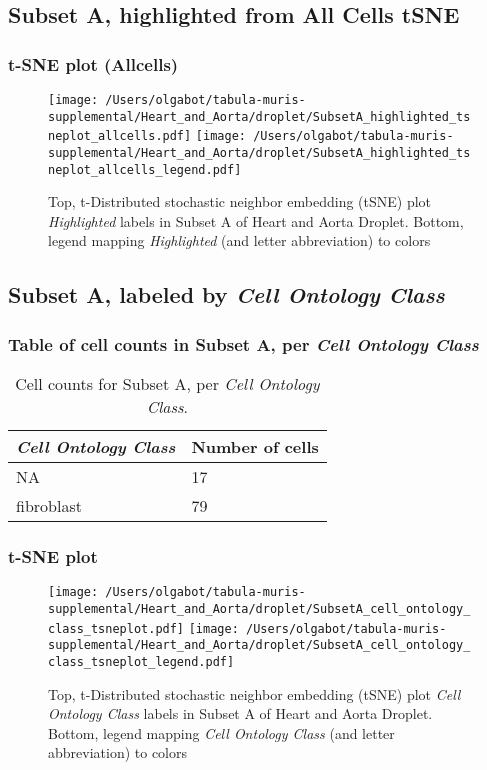 \clearpage
\subsection{Subset A, highlighted from All Cells tSNE}
\subsubsection{t-SNE plot (Allcells)}
\begin{figure}[h]
\centering
\texttt{[image: /Users/olgabot/tabula-muris-supplemental/Heart\_and\_Aorta/droplet/SubsetA\_highlighted\_tsneplot\_allcells.pdf]}
\texttt{[image: /Users/olgabot/tabula-muris-supplemental/Heart\_and\_Aorta/droplet/SubsetA\_highlighted\_tsneplot\_allcells\_legend.pdf]}
\caption{Top, t-Distributed stochastic neighbor embedding (tSNE) plot  \emph{Highlighted} labels in Subset A of Heart and Aorta Droplet. Bottom, legend mapping \emph{Highlighted} (and letter abbreviation) to colors}
\end{figure}


\clearpage

\subsection{Subset A, labeled by \emph{Cell Ontology Class}}
\subsubsection{Table of cell counts in Subset A, per \emph{Cell Ontology Class}}\begin{table}[h]
\centering
\label{my-label}
\begin{tabular}{@{}ll@{}}
\toprule

\emph{Cell Ontology Class}& Number of cells \\ \midrule
NA & 17 \\

fibroblast & 79 \\
\bottomrule
\end{tabular}
\caption{Cell counts for Subset A, per \emph{Cell Ontology Class}.}
\end{table}

\clearpage
\subsubsection{t-SNE plot}
\begin{figure}[h]
\centering
\texttt{[image: /Users/olgabot/tabula-muris-supplemental/Heart\_and\_Aorta/droplet/SubsetA\_cell\_ontology\_class\_tsneplot.pdf]}
\texttt{[image: /Users/olgabot/tabula-muris-supplemental/Heart\_and\_Aorta/droplet/SubsetA\_cell\_ontology\_class\_tsneplot\_legend.pdf]}
\caption{Top, t-Distributed stochastic neighbor embedding (tSNE) plot  \emph{Cell Ontology Class} labels in Subset A of Heart and Aorta Droplet. Bottom, legend mapping \emph{Cell Ontology Class} (and letter abbreviation) to colors}
\end{figure}


